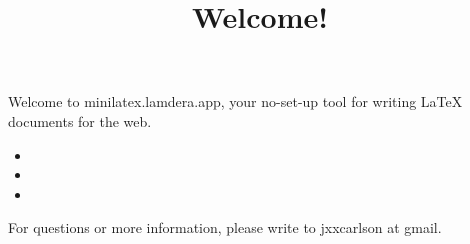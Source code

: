 \title{Welcome!}

\maketitle


Welcome to minilatex.lamdera.app, your no-set-up tool for writing LaTeX documents for the web.



\begin{itemize}

\item {}

\item {}

\item {}

\end{itemize}

For questions or more information, please write to jxxcarlson at gmail.

\medskip

